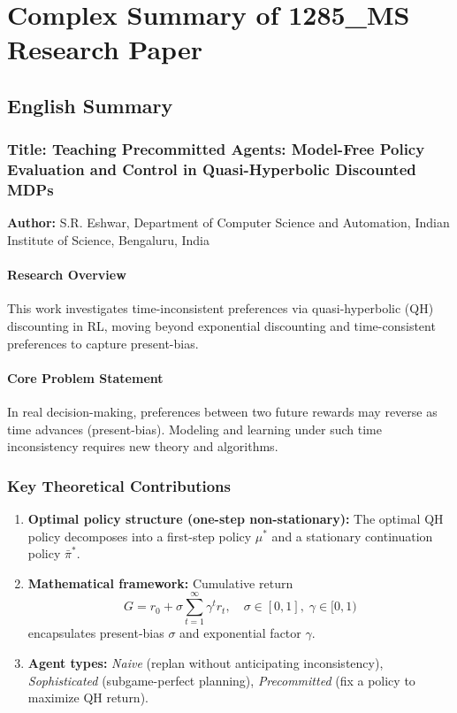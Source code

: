
\section*{Complex Summary of 1285\_MS Research Paper}

\subsection*{English Summary}
\subsubsection*{Title: Teaching Precommitted Agents: Model-Free Policy Evaluation and Control in Quasi-Hyperbolic Discounted MDPs}
\textbf{Author:} S.R. Eshwar, Department of Computer Science and Automation, Indian Institute of Science, Bengaluru, India

\paragraph{Research Overview}
This work investigates time-inconsistent preferences via quasi-hyperbolic (QH) discounting in RL, moving beyond exponential discounting and time-consistent preferences to capture present-bias.

\paragraph{Core Problem Statement}
In real decision-making, preferences between two future rewards may reverse as time advances (present-bias). Modeling and learning under such time inconsistency requires new theory and algorithms.

\subsubsection*{Key Theoretical Contributions}
\begin{enumerate}
  \item \textbf{Optimal policy structure (one-step non-stationary):} The optimal QH policy decomposes into a first-step policy $\mu^*$ and a stationary continuation policy $\bar{\pi}^*$.
  \item \textbf{Mathematical framework:} Cumulative return
  \[
    G = r_0 + \sigma \sum_{t=1}^{\infty} \gamma^t r_t,\quad \sigma\in[0,1],\; \gamma\in[0,1)
  \]
  encapsulates present-bias $\sigma$ and exponential factor $\gamma$.
  \item \textbf{Agent types:} \emph{Naive} (replan without anticipating inconsistency), \emph{Sophisticated} (subgame-perfect planning), \emph{Precommitted} (fix a policy to maximize QH return).
\end{enumerate}

